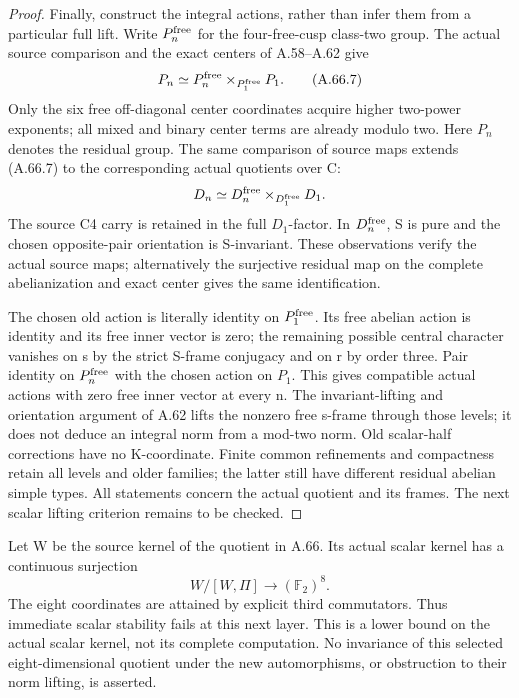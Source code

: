 \begin{proof}
Finally, construct the integral actions, rather than infer them
from a particular full lift. Write \(P_n^{\rm free}\) for the
four-free-cusp class-two group. The actual source comparison and
the exact centers of A.58--A.62 give
\[
 P_n\simeq P_n^{\rm free}
       \mathbin{\times}_{P_1^{\rm free}}P_1.
 \tag{A.66.7}
\]
Only the six free off-diagonal center coordinates acquire higher
two-power exponents; all mixed and binary center terms are
already modulo two. Here \(P_n\) denotes the residual group.
The same comparison of source maps extends (A.66.7) to the
corresponding actual quotients over C:
\[
 D_n\simeq D_n^{\rm free}
       \mathbin{\times}_{D_1^{\rm free}}D_1.
\]
The source C4 carry is retained in the full \(D_1\)-factor.
In \(D_n^{\rm free}\), S is pure and the chosen
opposite-pair orientation is S-invariant. These observations
verify the actual source maps; alternatively the surjective
residual map on the complete abelianization and exact center
gives the same identification.

The chosen old action is literally identity on
\(P_1^{\rm free}\). Its free abelian action is identity and
its free inner vector is zero; the remaining possible central
character vanishes on s by the strict S-frame conjugacy and
on r by order three. Pair identity on \(P_n^{\rm free}\)
with the chosen action on \(P_1\). This gives compatible
actual actions with zero free inner vector at every n.
The invariant-lifting and orientation argument of A.62 lifts
the nonzero free s-frame through those levels; it does not
deduce an integral norm from a mod-two norm. Old scalar-half
corrections have no K-coordinate. Finite common refinements
and compactness retain all levels and older families; the
latter still have different residual abelian simple types.
All statements concern the actual quotient and its frames. The
next scalar lifting criterion remains to be checked.
\end{proof}


Let W be the source kernel of the quotient in A.66. Its actual scalar
kernel has a continuous surjection
\[
 W/[W,\Pi]\longrightarrow (\mathbb F_2)^8.
 \tag{A.67.1}
\]
The eight coordinates are attained by explicit third commutators.
Thus immediate scalar stability fails at this next layer. This is a
lower bound on the actual scalar kernel, not its complete computation.
No invariance of this selected eight-dimensional quotient under the
new automorphisms, or obstruction to their norm lifting, is asserted.

